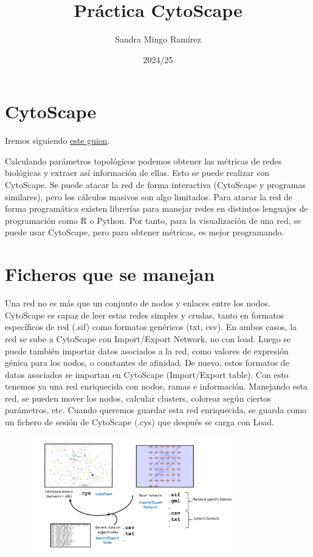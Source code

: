 \documentclass[nochap]{config/ejercicios}
\title{Práctica CytoScape}
\author{Sandra Mingo Ramírez}
\date{2024/25}
\begin{document}
\maketitle
\tableofcontents
\newpage

\section{CytoScape}
Iremos siguiendo \href{https://csbg.cnb.csic.es/pazos/cursos/UAM_Master/cytoscape_practical/}{este guion}. 

Calculando parámetros topológicos podemos obtener las métricas de redes biológicas y extraer así información de ellas. Esto se puede realizar con CytoScape. Se puede atacar la red de forma interactiva (CytoScape y programas similares), pero los cálculos masivos son algo limitados. Para atacar la red de forma programática existen librerías para manejar redes en distintos lenguajes de programación como R o Python. Por tanto, para la visualización de una red, se puede usar CytoScape, pero para obtener métricas, es mejor programando.

\section{Ficheros que se manejan}
Una red no es más que un conjunto de nodos y enlaces entre los nodos. CytoScape es capaz de leer estas redes simples y crudas, tanto en formatos específicos de red (.sif) como formatos genéricos (txt, csv). En ambos casos, la red se sube a CytoScape con Import/Export Network, no con load. Luego se puede también importar datos asociados a la red, como valores de expresión génica para los nodos, o constantes de afinidad. De nuevo, estos formatos de datos asociados se importan en CytoScape (Import/Export table). Con esto tenemos ya una red enriquecida con nodos, ramas e información. Manejando esta red, se pueden mover los nodos, calcular clusters, colorear según ciertos parámetros, etc. Cuando queremos guardar esta red enriquecida, se guarda como un fichero de sesión de CytoScape (.cys) que después se carga con Load. 

\begin{figure}[h]
\centering
\includegraphics[width = 0.8\textwidth]{figs/cytoscape_data.png}
\end{figure}
\end{document}
